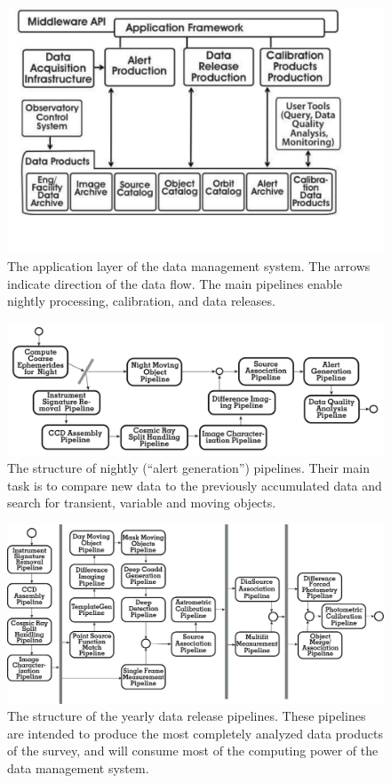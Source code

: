 \documentclass{emulateapj}
\begin{document}
\begin{figure}[t!]
\hskip -0.1in
\includegraphics[width=1.15\hsize,clip]{DMp2.pdf}
\vskip -0.3in
\caption{The application layer of the data management system. The arrows indicate
direction of the data flow. The main pipelines enable nightly processing,
calibration, and data releases.} 
\label{Fig:DM4}
\end{figure}

\begin{figure}
\includegraphics[width=1.0\hsize,clip]{DMp4.pdf}
\caption{The structure of nightly (``alert generation'') pipelines. 
Their main task is to compare new data to the previously accumulated data and search for 
transient, variable and moving objects.} 
\label{Fig:DM5}
\end{figure}

\begin{figure}[t!]
\hskip 0.3in
\includegraphics[width=0.92\hsize,clip]{DMp3.pdf}
\caption{The structure of the yearly data release pipelines.
These pipelines are intended to produce the most completely analyzed data products 
of the survey, and will consume most of the computing power of the data management 
system.} 
\label{Fig:DM6}
\end{figure}
\end{document}
